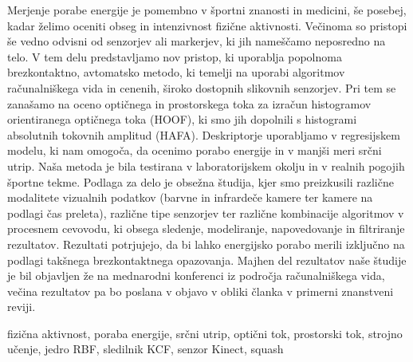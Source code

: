 \povzetek
Merjenje porabe energije je pomembno v športni znanosti in medicini, še posebej, kadar želimo oceniti obseg in intenzivnost fizične aktivnosti. Večinoma so pristopi še vedno odvisni od senzorjev ali markerjev, ki jih nameščamo neposredno na telo. V tem delu predstavljamo nov pristop, ki uporablja popolnoma brezkontaktno, avtomatsko metodo, ki temelji na uporabi algoritmov računalniškega vida in cenenih, široko dostopnih slikovnih senzorjev. Pri tem se zanašamo na oceno optičnega in prostorskega toka za izračun histogramov orientiranega optičnega toka (HOOF), ki smo jih dopolnili s histogrami absolutnih tokovnih amplitud (HAFA). Deskriptorje uporabljamo v regresijskem modelu, ki nam omogoča, da ocenimo porabo energije in v manjši meri srčni utrip. Naša metoda je bila testirana v laboratorijskem okolju in v realnih pogojih športne tekme. Podlaga za delo je obsežna študija, kjer smo preizkusili različne modalitete vizualnih podatkov (barvne in infrardeče kamere ter kamere na podlagi čas preleta), različne tipe senzorjev ter različne kombinacije algoritmov v procesnem cevovodu, ki obsega sledenje, modeliranje, napovedovanje in filtriranje rezultatov. Rezultati potrjujejo, da bi lahko energijsko porabo merili izključno na podlagi takšnega brezkontaktnega opazovanja. Majhen del rezultatov naše študije je bil objavljen že na mednarodni konferenci iz področja računalniškega vida, večina rezultatov pa bo poslana v objavo v obliki članka v primerni znanstveni reviji.

\kljucnebesede fizična aktivnost, poraba energije, srčni utrip, optični tok, prostorski tok, strojno učenje, jedro RBF, sledilnik KCF, senzor Kinect, squash